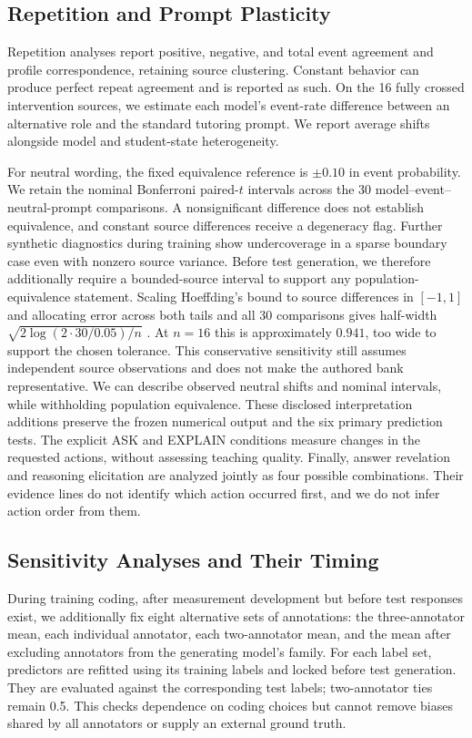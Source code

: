 \subsection{Repetition and Prompt Plasticity}

Repetition analyses report positive, negative, and total event agreement and
profile correspondence, retaining source clustering. Constant behavior can
produce perfect repeat agreement and is reported as such. On the 16 fully
crossed intervention sources, we estimate each model's event-rate difference
between an alternative role and the standard tutoring prompt. We report average shifts
alongside model and student-state heterogeneity.

For neutral wording, the fixed equivalence reference is $\pm0.10$ in event
probability. We retain the nominal Bonferroni paired-$t$ intervals across the
30 model--event--neutral-prompt comparisons. A nonsignificant difference does not
establish equivalence, and constant source differences receive a degeneracy
flag. Further synthetic diagnostics during training show undercoverage in a
sparse boundary case even with nonzero source variance. Before test
generation, we therefore additionally require a bounded-source interval to
support any population-equivalence statement. Scaling Hoeffding's bound to
source differences in $[-1,1]$ and allocating error across both tails and all
30 comparisons gives half-width
$\sqrt{2\log(2\cdot30/0.05)/n}$ \citep{hoeffding1963}. At $n=16$ this is
approximately $0.941$, too wide to support the chosen tolerance. This
conservative sensitivity still assumes independent source observations and
does not make the authored bank representative. We can describe observed
neutral shifts and nominal intervals, while withholding population equivalence.
These disclosed interpretation additions preserve the frozen numerical output
and the six primary prediction tests. The
explicit ASK and EXPLAIN conditions measure changes in the requested actions, without assessing teaching quality. Finally, answer revelation and reasoning elicitation are analyzed
jointly as four possible combinations. Their evidence lines do not identify
which action occurred first, and we do not infer action order from them.

\subsection{Sensitivity Analyses and Their Timing}

During training coding, after measurement development but before test
responses exist, we additionally fix eight alternative sets of annotations: the
three-annotator mean, each individual annotator, each two-annotator mean, and the mean after
excluding annotators from the generating model's family. For each label set, predictors are refitted
using its training labels and locked before test generation. They are
evaluated against the corresponding test labels; two-annotator ties remain
0.5. This checks dependence on coding choices but cannot remove biases shared
by all annotators or supply an external ground truth.

